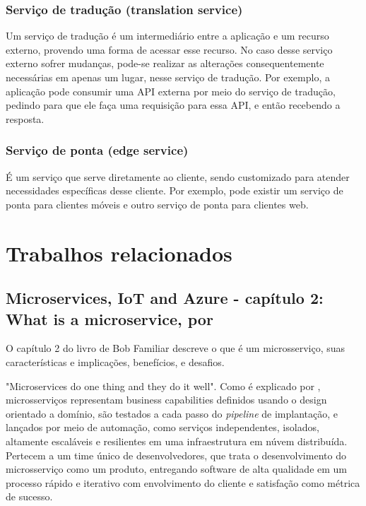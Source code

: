 \subsubsection{Serviço de tradução (translation service)}
Um serviço de tradução é um intermediário entre a aplicação e um recurso externo, provendo uma forma de acessar esse recurso. No caso desse serviço externo sofrer mudanças, pode-se realizar as alterações consequentemente necessárias em apenas um lugar, nesse serviço de tradução. Por exemplo, a aplicação pode consumir uma API externa por meio do serviço de tradução, pedindo para que ele faça uma requisição para essa API, e então recebendo a resposta. %

\subsubsection{Serviço de ponta (edge service)}
É um serviço que serve diretamente ao cliente, sendo customizado para atender necessidades específicas desse cliente. Por exemplo, pode existir um serviço de ponta para clientes móveis e outro serviço de ponta para clientes web.

\section{Trabalhos relacionados}

\subsection{{Microservices, IoT and Azure - capítulo 2: What is a microservice, por }}

O capítulo 2 do livro de Bob Familiar descreve o que é um microsserviço, suas características e implicações, benefícios, e desafios. 

"Microservices do one thing and they do it well". Como é explicado por  , microsserviços representam business capabilities definidos usando o design orientado a domínio, são testados a cada passo do \emph{pipeline} de implantação, e lançados por meio de automação, como serviços independentes, isolados, altamente escaláveis e resilientes em uma infraestrutura em núvem distribuída. Pertecem a um time único de desenvolvedores, que trata o desenvolvimento do microsserviço como um produto, entregando software de alta qualidade em um processo rápido e iterativo com envolvimento do cliente e satisfação como métrica de sucesso.

